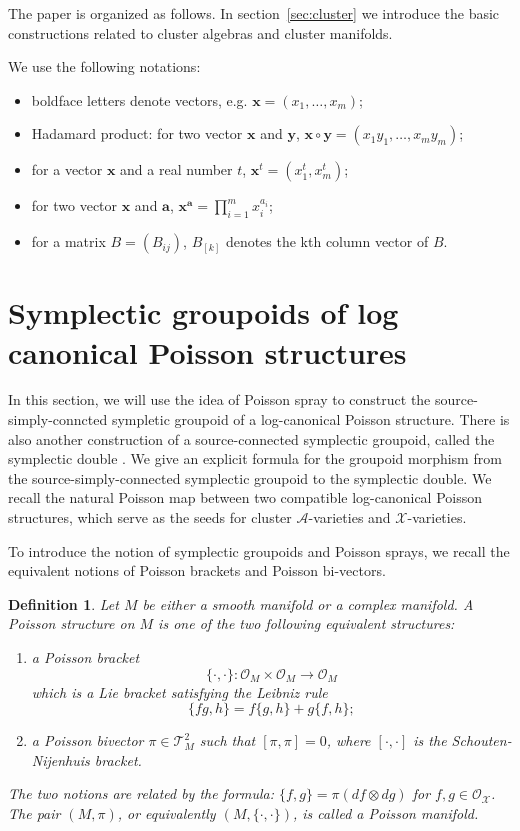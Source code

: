 \documentclass{amsart}
\newtheorem{definition}[theorem]{Definition}
\numberwithin{equation}{section}
\newcommand{\bfa}{\mathbf{a}}
\newcommand{\bfx}{\mathbf{x}}
\newcommand{\bfy}{\mathbf{y}}
\newcommand{\cA}{\mathcal{A}}
\newcommand{\cO}{\mathcal{O}}
\newcommand{\cX}{\mathcal{X}}
\newcommand{\cT}{\mathcal{T}}
\begin{document}
The paper is organized as follows.
In section~\ref{sec:cluster} we introduce the basic constructions related to cluster algebras and cluster manifolds.

We use the following notations:
\begin{itemize}
	\item boldface letters denote vectors, e.g. $\bfx = (x_1, \ldots, x_m)$;
	\item Hadamard product: for two vector $\bfx$ and $\bfy$, $\bfx \circ \bfy = (x_1y_1, \ldots, x_my_m)$;
	\item for a vector $\bfx$ and a real number $t$, $\bfx^t = (x_1^t, x_m^t)$;
	\item for two vector $\bfx$ and $\bfa$, $\bfx^\bfa = \prod_{i=1}^m x_i^{a_i}$;
	\item for a matrix $B = (B_{ij})$, $B_{[k]}$ denotes the kth column vector of $B$.
\end{itemize}

\section{Symplectic groupoids of log canonical Poisson structures}

In this section, we will use the idea of Poisson spray \cite{MR2900786} to construct the source-simply-conncted sympletic groupoid of a log-canonical Poisson structure. There is also another construction of a source-connected symplectic groupoid, called the symplectic double \cite{MR2470108}. We give an explicit formula for the groupoid morphism from the source-simply-connected symplectic groupoid to the symplectic double. We recall the natural Poisson map between two compatible log-canonical Poisson structures, which serve as the seeds for cluster $\cA$-varieties and $\cX$-varieties.


To introduce the notion of symplectic groupoids and Poisson sprays, we recall the equivalent notions of Poisson brackets and Poisson bi-vectors.

\begin{definition}
  Let $M$ be either a smooth manifold or a complex manifold. A Poisson structure on $M$ is one of the two following equivalent structures:
  \begin{enumerate}
    \item a Poisson bracket
      $$\{\cdot, \cdot\}: \cO_M \times \cO_M \to \cO_M$$
      which is a Lie bracket satisfying the Leibniz rule
      $$\{fg, h\} = f\{g,h\} + g\{f,h\};$$
    \item a Poisson bivector $\pi \in \cT^2_M$ such that $[\pi, \pi] = 0$, where $[\cdot, \cdot]$ is the Schouten-Nijenhuis bracket.
  \end{enumerate}	
  The two notions are related by the formula: $\{f, g\} = \pi (df \otimes dg)$ for $f, g\in \cO_\cX$.
  The pair $(M, \pi)$, or equivalently $(M, \{\cdot,\cdot\})$, is called a Poisson manifold.
\end{definition}
\end{document}
